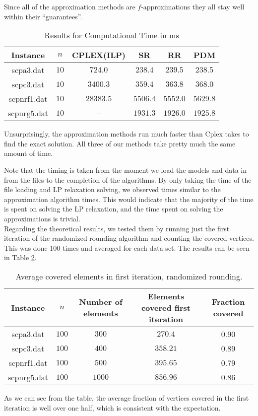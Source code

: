 \documentclass[11pt,a4paper,english]{article}
\begin{document}
Since all of the approximation methods are $f$-approximations \citep[pp. 118-131]{Vaz} they all stay well within their ``guarantees''.

\begin{table}[h!]
  \centering
  \begin{tabular}{|c|c|c|c|c|c|}\hline
    Instance& $n$& CPLEX(ILP)&SR&RR&PDM \\\hline
    scpa3.dat &$10$&$724.0$ & $238.4$& $239.5$ & $238.5$  \\
    scpc3.dat &$10$ & $3400.3$ & $359.4$& $363.8$ & $368.0$ \\
    scpnrf1.dat	 &$10$ & $28383.5$ & $5506.4$& $5552.0$ & $5629.8$  \\
    scpnrg5.dat &$10$ & -- & $1931.3$& $1926.0$ & $1925.8$  \\\hline
  \end{tabular}
  \caption{Results for Computational Time in ms}
  \label{tab:time}
\end{table}

 Unsurprisingly, the approximation methods run much faster than Cplex takes to find the exact solution. All three of our methods take pretty much the same amount of time.

 Note that the timing is taken from the moment we load the models and data in from the files to the completion of the algorithms. By only taking the time of the file loading and LP relaxation solving, we observed times similar to the approximation algorithm times. This would indicate that the majority of the time is spent on solving the LP relaxation, and the time spent on solving the approximations is trivial.\\

Regarding the theoretical results, we tested them by running just the first iteration of the randomized rounding algorithm and counting the covered vertices. This was done 100 times and averaged for each data set. The results can be seen in Table \ref{tab:rand}.

\begin{table}[h!]
  \centering
  \begin{tabular}{|c|c|c|c|c|}\hline
    Instance& $n$ & Number of elements & Elements covered first iteration & Fraction covered\\\hline
    scpa3.dat &$100$    & $300$ & $270.4$ & 0.90 \\
    scpc3.dat &$100$    & $400$ & $358.21$ & 0.89\\
    scpnrf1.dat	 &$100$ & $500$ & $395.65$ & 0.79 \\
    scpnrg5.dat &$100$  & $1000$ & $856.96$ & 0.86 \\\hline
  \end{tabular}
  \caption{Average covered elements in first iteration, randomized rounding.}
  \label{tab:rand}
\end{table}

As we can see from the table, the average fraction of vertices covered in the first iteration is well over one half, which is consistent with the expectation.

\clearpage


\end{document}
